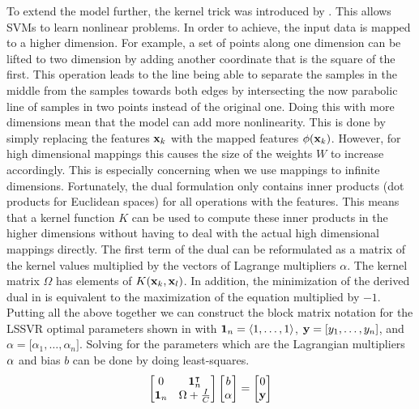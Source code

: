 To extend the model further, the kernel trick was introduced by \textcite{vapnikNatureStatisticalLearning2000}. This allows SVMs to learn nonlinear problems. In order to achieve, the input data is mapped to a higher dimension. For example, a set of points along one dimension can be lifted to two dimension by adding another coordinate that is the square of the first. This operation leads to the line being able to separate the samples in the middle from the samples towards both edges by intersecting the now parabolic line of samples in two points instead of the original one. Doing this with more dimensions mean that the model can add more nonlinearity. This is done by simply replacing the features \(\vb{x}_{k}\) with the mapped features \(\phi(\vb{x}_{k})\). However, for high dimensional mappings this causes the size of the weights \(W\) to increase accordingly. This is especially concerning when we use mappings to infinite dimensions. Fortunately, the dual formulation only contains inner products (dot products for Euclidean spaces) for all operations with the features. This means that a kernel function \(K\) can be used to compute these inner products in the higher dimensions without having to deal with the actual high dimensional mappings directly. The first term of the dual can be reformulated as a matrix of the kernel values multiplied by the vectors of Lagrange multipliers \(\alpha \). The kernel matrix \(\Omega \) has elements of \(K(\vb{x}_{k},\vb{x}_{l})\). In addition, the minimization of the derived dual in  is equivalent to the maximization of the equation multiplied by \(-1\). Putting all the above together we can construct the block matrix notation for the LSSVR optimal parameters shown in  with \(\vb{1}_{n} = \langle 1,\dots,1\rangle \), \(\vb{y} = \lbrack y_1, \dots, y_n \rbrack \), and \({\alpha} = \lbrack \alpha_1, \dots, \alpha_n \rbrack \). Solving for the parameters which are the Lagrangian multipliers \(\vb{\alpha}\) and bias \(b\) can be done by doing least-squares.
\begin{equation} \label{eq:lssvr_solution}
  \begin{bmatrix}
    0          & \vb{1}_{n}^{\intercal} \\
    \vb{1}_{n} & \Omega + \frac{I}{C}
  \end{bmatrix}
  \begin{bmatrix}
    b           \\
    \vb{\alpha} \\
  \end{bmatrix}
  =
  \begin{bmatrix}
    0      \\
    \vb{y} \\
  \end{bmatrix}
\end{equation}


